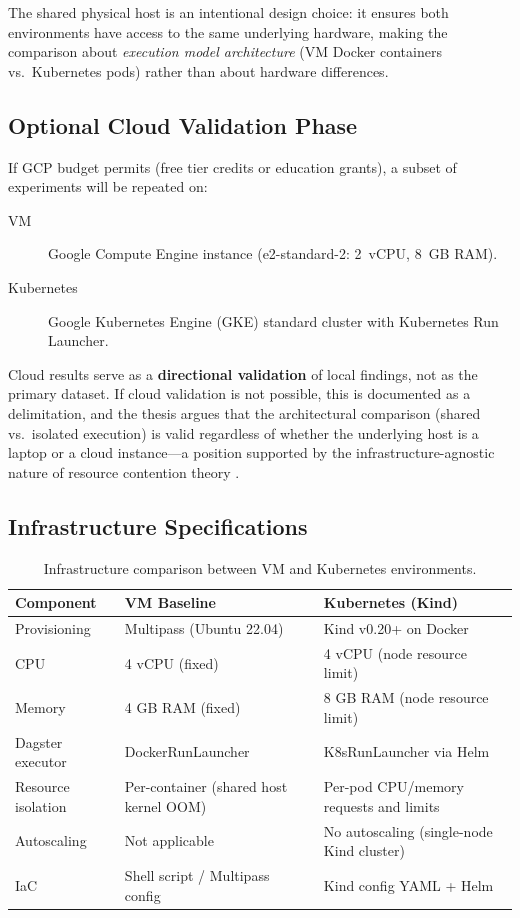 The shared physical host is an intentional design choice: it ensures both environments have access to the same underlying hardware, making the comparison about \emph{execution model architecture} (VM Docker containers vs.\ Kubernetes pods) rather than about hardware differences.

\subsection{Optional Cloud Validation Phase}
\label{subsec:cloud-validation}

If GCP budget permits (free tier credits or education grants), a subset of experiments will be repeated on:

\begin{description}
  \item[VM] Google Compute Engine instance (e2-standard-2: 2~vCPU, 8~GB RAM).
  \item[Kubernetes] Google Kubernetes Engine (GKE) standard cluster with Kubernetes Run Launcher.
\end{description}

Cloud results serve as a \textbf{directional validation} of local findings, not as the primary dataset. If cloud validation is not possible, this is documented as a delimitation, and the thesis argues that the architectural comparison (shared vs.\ isolated execution) is valid regardless of whether the underlying host is a laptop or a cloud instance---a position supported by the infrastructure-agnostic nature of resource contention theory \citep{nanda1991}.

\subsection{Infrastructure Specifications}
\label{subsec:infra-specs}

\begin{table}[H]
  \centering
  \caption{Infrastructure comparison between VM and Kubernetes environments.}
  \label{tab:infra-specs}
  \small
  \begin{tabularx}{\textwidth}{lXX}
    \toprule
    \textbf{Component} & \textbf{VM Baseline} & \textbf{Kubernetes (Kind)} \\
    \midrule
    Provisioning        & Multipass (Ubuntu 22.04)       & Kind v0.20+ on Docker \\
    CPU                 & 4 vCPU (fixed)                 & 4 vCPU (node resource limit) \\
    Memory              & 4 GB RAM (fixed)               & 8 GB RAM (node resource limit) \\
    Dagster executor    & DockerRunLauncher              & K8sRunLauncher via Helm \\
    Resource isolation  & Per-container (shared host kernel OOM) & Per-pod CPU/memory requests and limits \\
    Autoscaling         & Not applicable                 & No autoscaling (single-node Kind cluster) \\
    IaC                 & Shell script / Multipass config & Kind config YAML + Helm \\
    \bottomrule
  \end{tabularx}
\end{table}
